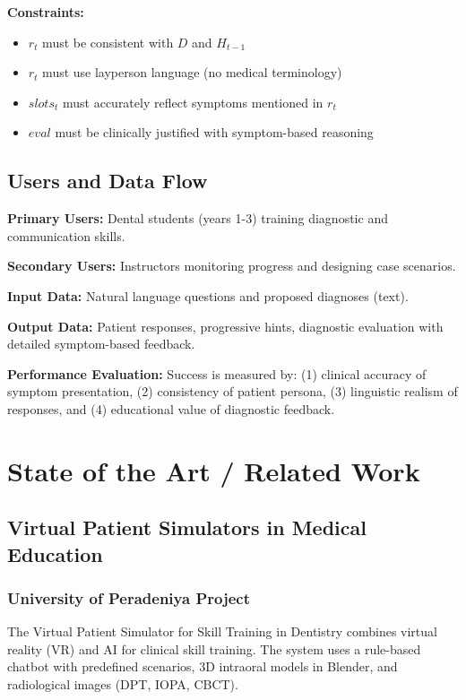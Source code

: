 \documentclass[runningheads,a4paper,11pt]{report}
\begin{document}
\textbf{Constraints:}
\begin{itemize}
\item $r_t$ must be consistent with $D$ and $H_{t-1}$
\item $r_t$ must use layperson language (no medical terminology)
\item $slots_t$ must accurately reflect symptoms mentioned in $r_t$
\item $eval$ must be clinically justified with symptom-based reasoning
\end{itemize}

\section{Users and Data Flow}
\label{section:users}

\textbf{Primary Users:} Dental students (years 1-3) training diagnostic and communication skills.

\textbf{Secondary Users:} Instructors monitoring progress and designing case scenarios.

\textbf{Input Data:} Natural language questions and proposed diagnoses (text).

\textbf{Output Data:} Patient responses, progressive hints, diagnostic evaluation with detailed symptom-based feedback.

\textbf{Performance Evaluation:} Success is measured by: (1) clinical accuracy of symptom presentation, (2) consistency of patient persona, (3) linguistic realism of responses, and (4) educational value of diagnostic feedback.

\chapter{State of the Art / Related Work}
\label{chapter:stateOfArt}

\section{Virtual Patient Simulators in Medical Education}

\subsection{University of Peradeniya Project}

The Virtual Patient Simulator for Skill Training in Dentistry \cite{cepdnaclk2022} combines virtual reality (VR) and AI for clinical skill training. The system uses a rule-based chatbot with predefined scenarios, 3D intraoral models in Blender, and radiological images (DPT, IOPA, CBCT).
\end{document}
